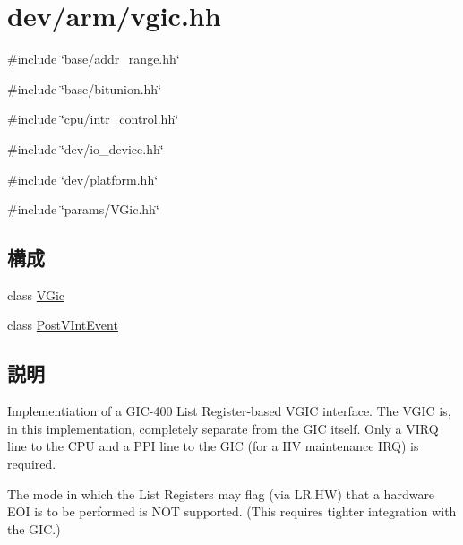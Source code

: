 \hypertarget{vgic_8hh}{
\section{dev/arm/vgic.hh}
\label{vgic_8hh}
}
{\ttfamily \#include \char`\"{}base/addr\_\-range.hh\char`\"{}}\par
{\ttfamily \#include \char`\"{}base/bitunion.hh\char`\"{}}\par
{\ttfamily \#include \char`\"{}cpu/intr\_\-control.hh\char`\"{}}\par
{\ttfamily \#include \char`\"{}dev/io\_\-device.hh\char`\"{}}\par
{\ttfamily \#include \char`\"{}dev/platform.hh\char`\"{}}\par
{\ttfamily \#include \char`\"{}params/VGic.hh\char`\"{}}\par
\subsection*{構成}
\begin{DoxyCompactItemize}
\item 
class \hyperlink{classVGic}{VGic}
\item 
class \hyperlink{classVGic_1_1PostVIntEvent}{PostVIntEvent}
\end{DoxyCompactItemize}


\subsection{説明}
Implementiation of a GIC-\/400 List Register-\/based VGIC interface. The VGIC is, in this implementation, completely separate from the GIC itself. Only a VIRQ line to the CPU and a PPI line to the GIC (for a HV maintenance IRQ) is required.

The mode in which the List Registers may flag (via LR.HW) that a hardware EOI is to be performed is NOT supported. (This requires tighter integration with the GIC.) 